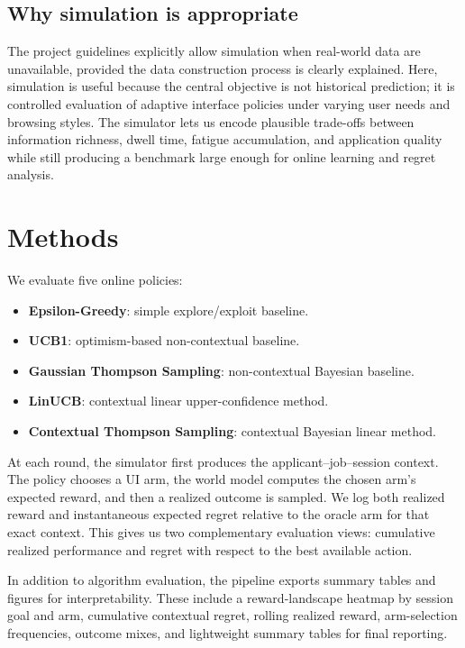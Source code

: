 \documentclass[10pt,twocolumn]{article}
\begin{document}
\subsection{Why simulation is appropriate}
The project guidelines explicitly allow simulation when real-world data are unavailable, provided the data construction process is clearly explained. Here, simulation is useful because the central objective is not historical prediction; it is controlled evaluation of adaptive interface policies under varying user needs and browsing styles. The simulator lets us encode plausible trade-offs between information richness, dwell time, fatigue accumulation, and application quality while still producing a benchmark large enough for online learning and regret analysis.

\section{Methods}
We evaluate five online policies:
\begin{itemize}
    \item \textbf{Epsilon-Greedy}: simple explore/exploit baseline.
    \item \textbf{UCB1}: optimism-based non-contextual baseline.
    \item \textbf{Gaussian Thompson Sampling}: non-contextual Bayesian baseline.
    \item \textbf{LinUCB}: contextual linear upper-confidence method.
    \item \textbf{Contextual Thompson Sampling}: contextual Bayesian linear method.
\end{itemize}

At each round, the simulator first produces the applicant--job--session context. The policy chooses a UI arm, the world model computes the chosen arm's expected reward, and then a realized outcome is sampled. We log both realized reward and instantaneous expected regret relative to the oracle arm for that exact context. This gives us two complementary evaluation views: cumulative realized performance and regret with respect to the best available action.

In addition to algorithm evaluation, the pipeline exports summary tables and figures for interpretability. These include a reward-landscape heatmap by session goal and arm, cumulative contextual regret, rolling realized reward, arm-selection frequencies, outcome mixes, and lightweight summary tables for final reporting.
\end{document}
